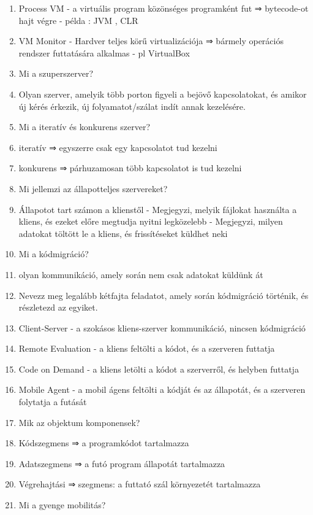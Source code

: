 \documentclass[twoside, a4paper, 12pt]{article}
\begin{document}
\begin{enumerate}
    \item Process VM
        - a virtuális program közönséges programként fut ⇒ bytecode-ot hajt végre
        - példa : JVM , CLR
    \item VM Monitor
        - Hardver teljes körű virtualizációja ⇒ bármely operációs rendszer futtatására alkalmas
        - pl VirtualBox
    \item  Mi a szuperszerver?
    \item Olyan szerver, amelyik több porton figyeli a bejövő kapcsolatokat, és amikor új kérés érkezik, új folyamatot/szálat indít
        annak kezelésére. 
    \item  Mi a iteratív és konkurens szerver?
    \item iteratív  ⇒ egyszerre csak egy kapcsolatot tud kezelni
    \item konkurens ⇒ párhuzamosan több kapcsolatot is tud kezelni
    \item  Mi jellemzi az állapotteljes szervereket?
    \item Állapotot tart számon a klienstől
        - Megjegyzi, melyik fájlokat használta a kliens, és ezeket előre megtudja nyitni legközelebb
        - Megjegyzi, milyen adatokat töltött le a kliens, és frissítéseket küldhet neki
    \item  Mi a kódmigráció?
    \item olyan kommunikáció, amely során nem csak adatokat küldünk át
    \item  Nevezz meg legalább kétfajta feladatot, amely során kódmigráció történik, és részletezd az egyiket.
    \item Client-Server
        - a szokásos kliens-szerver kommunikáció, nincsen kódmigráció
    \item Remote Evaluation 
        - a kliens feltölti a kódot, és a szerveren futtatja
    \item Code on Demand 
        - a kliens letölti a kódot a szerverről, és helyben futtatja
    \item Mobile Agent 
        - a mobil ágens feltölti a kódját és az állapotát, és a szerveren folytatja a futását
    \item  Mik az objektum komponensek?
    \item Kódszegmens  ⇒ a programkódot tartalmazza
    \item Adatszegmens ⇒ a futó program állapotát tartalmazza
    \item Végrehajtási ⇒ szegmens: a futtató szál környezetét tartalmazza
    \item  Mi a gyenge mobilitás?

\end{enumerate}
\end{document}
